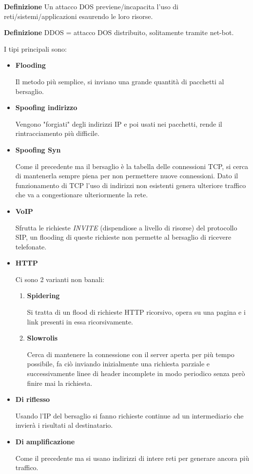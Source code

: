 \documentclass{article}
\newcommand{\df}[1]{\noindent\textbf{Definizione } #1.\newline}
\begin{document}
\df{Un attacco DOS previene/incapacita l'uso di reti/sistemi/applicazioni esaurendo le loro risorse}

\df{DDOS = attacco DOS distribuito, solitamente tramite net-bot}

\noindent I tipi principali sono:
\begin{itemize}
    \item \textbf{Flooding}

        Il metodo più semplice, si inviano una grande quantità di pacchetti al bersaglio.
    
    \item \textbf{Spoofing indirizzo}

        Vengono "forgiati" degli indirizzi IP e poi usati nei pacchetti, rende il rintracciamento più difficile. 
    
    \item \textbf{Spoofing Syn}

        Come il precedente ma il bersaglio è la tabella delle connessioni TCP, si cerca di mantenerla sempre piena per non permettere nuove connessioni. Dato il funzionamento di TCP l'uso di indirizzi non esistenti genera ulteriore traffico che va a congestionare ulteriormente la rete.
     
    \item \textbf{VoIP}

        Sfrutta le richieste \textit{INVITE} (dispendiose a livello di risorse) del protocollo SIP, un flooding di queste richieste non permette al bersaglio di ricevere telefonate.
    
    \item \textbf{HTTP}

        Ci sono 2 varianti non banali:
            \begin{enumerate}
                \item \textbf{Spidering}

                    Si tratta di un flood di richieste HTTP ricorsivo, opera su una pagina e i link presenti in essa ricorsivamente.
                
                \item \textbf{Slowrolis}

                    Cerca di mantenere la connessione con il server aperta per più tempo possibile, fa ciò inviando inizialmente una richiesta parziale e successivamente linee di header incomplete in modo periodico senza però finire mai la richiesta.
                
            \end{enumerate}
    
    \item \textbf{Di riflesso}

        Usando l'IP del bersaglio si fanno richieste continue ad un intermediario che invierà i risultati al destinatario.
    
    \item \textbf{Di amplificazione}

        Come il precedente ma si usano indirizzi di intere reti per generare ancora più traffico.
    
\end{itemize}
\end{document}

